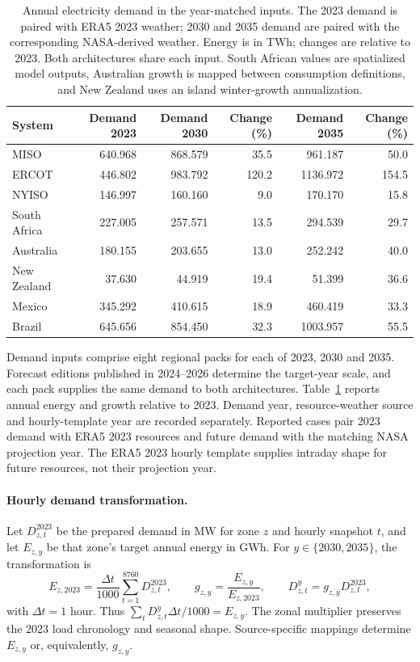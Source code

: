 \documentclass[pdflatex,sn-nature]{sn-jnl}
\begin{document}
\begin{table}[tbp]
\caption{Annual electricity demand in the year-matched inputs. The 2023 demand is paired with ERA5 2023 weather; 2030 and 2035 demand are paired with the corresponding NASA-derived weather. Energy is in TWh; changes are relative to 2023. Both architectures share each input. South African values are spatialized model outputs, Australian growth is mapped between consumption definitions, and New Zealand uses an island winter-growth annualization.}
\label{tab:future-demand-inputs}
\centering\small
\begingroup\setlength{\tabcolsep}{4pt}
\begin{tabular}{@{}lrrrrr@{}}
\toprule
System & Demand 2023 & Demand 2030 & Change (\%) & Demand 2035 & Change (\%)\\
\midrule
MISO & 640.968 & 868.579 & 35.5 & 961.187 & 50.0\\
ERCOT & 446.802 & 983.792 & 120.2 & 1136.972 & 154.5\\
NYISO & 146.997 & 160.160 & 9.0 & 170.170 & 15.8\\
South Africa & 227.005 & 257.571 & 13.5 & 294.539 & 29.7\\
Australia & 180.155 & 203.655 & 13.0 & 252.242 & 40.0\\
New Zealand & 37.630 & 44.919 & 19.4 & 51.399 & 36.6\\
Mexico & 345.292 & 410.615 & 18.9 & 460.419 & 33.3\\
Brazil & 645.656 & 854.450 & 32.3 & 1003.957 & 55.5\\
\bottomrule
\end{tabular}
\endgroup
\end{table}

Demand inputs comprise eight regional packs for each of 2023, 2030 and 2035. Forecast editions published in 2024--2026 determine the target-year scale, and each pack supplies the same demand to both architectures. Table~\ref{tab:future-demand-inputs} reports annual energy and growth relative to 2023. Demand year, resource-weather source and hourly-template year are recorded separately. Reported cases pair 2023 demand with ERA5 2023 resources and future demand with the matching NASA projection year. The ERA5 2023 hourly template supplies intraday shape for future resources, not their projection year.

\paragraph{Hourly demand transformation.}
Let $D_{z,t}^{2023}$ be the prepared demand in MW for zone $z$ and hourly snapshot $t$, and let $E_{z,y}$ be that zone's target annual energy in GWh. For $y\in\{2030,2035\}$, the transformation is
\begin{equation}
E_{z,2023}=\frac{\Delta t}{1000}\sum_{t=1}^{8760}D_{z,t}^{2023},\qquad
g_{z,y}=\frac{E_{z,y}}{E_{z,2023}},\qquad
D_{z,t}^{y}=g_{z,y}D_{z,t}^{2023},
\label{eq:demand-scaling}
\end{equation}
with $\Delta t=1$ hour. Thus $\sum_t D_{z,t}^{y}\Delta t/1000=E_{z,y}$. The zonal multiplier preserves the 2023 load chronology and seasonal shape. Source-specific mappings determine $E_{z,y}$ or, equivalently, $g_{z,y}$.
\end{document}
